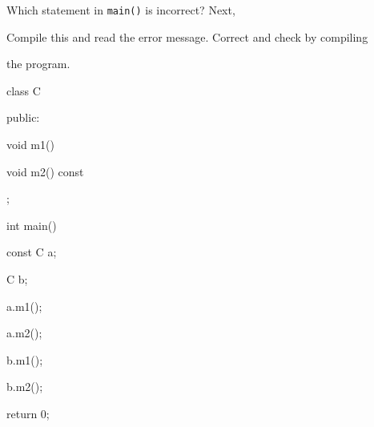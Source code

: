 Which statement in \texttt{main()} is incorrect? Next,

Compile this and read the error message. Correct and check by compiling

the program.



\begin{consolethree}[escapeinside=||]

class C

{

public:

    void m1()

    {}

    void m2() const

    {}

};



int main()

{

    const C a;

    C b;

    a.m1();

    a.m2();

    b.m1();

    b.m2();

    return 0;

}

\end{consolethree}

